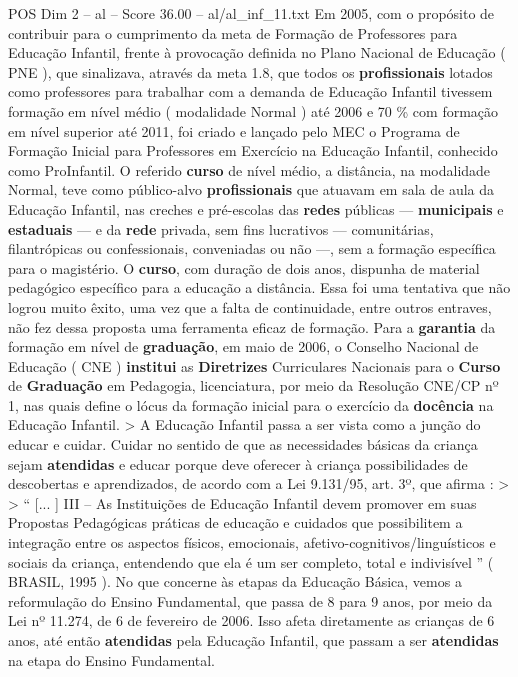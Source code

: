 \begin{textsample}{POS Dim 2 – al – Score 36.00 – al/al\_inf\_11.txt}
Em 2005, com o propósito de contribuir para o cumprimento da meta de Formação de Professores para Educação Infantil, frente à provocação definida no Plano Nacional de Educação ( PNE ), que sinalizava, através da meta 1.8, que todos os \textbf{profissionais} lotados como professores para trabalhar com a demanda de Educação Infantil tivessem formação em nível médio ( modalidade Normal ) até 2006 e 70 \% com formação em nível superior até 2011, foi criado e lançado pelo MEC o Programa de Formação Inicial para Professores em Exercício na Educação Infantil, conhecido como ProInfantil.
O referido \textbf{curso} de nível médio, a distância, na modalidade Normal, teve como público-alvo \textbf{profissionais} que atuavam em sala de aula da Educação Infantil, nas creches e pré-escolas das \textbf{redes} públicas — \textbf{municipais} e \textbf{estaduais} — e da \textbf{rede} privada, sem fins lucrativos — comunitárias, filantrópicas ou confessionais, conveniadas ou não —, sem a formação específica para o magistério.
O \textbf{curso}, com duração de dois anos, dispunha de material pedagógico específico para a educação a distância.
Essa foi uma tentativa que não logrou muito êxito, uma vez que a falta de continuidade, entre outros entraves, não fez dessa proposta uma ferramenta eficaz de formação.
Para a \textbf{garantia} da formação em nível de \textbf{graduação}, em maio de 2006, o Conselho Nacional de Educação ( CNE ) \textbf{institui} as \textbf{Diretrizes} Curriculares Nacionais para o \textbf{Curso} de \textbf{Graduação} em Pedagogia, licenciatura, por meio da Resolução CNE/CP nº 1, nas quais define o lócus da formação inicial para o exercício da \textbf{docência} na Educação Infantil. > A Educação Infantil passa a ser vista como a junção do educar e cuidar.
Cuidar no sentido de que as necessidades básicas da criança sejam \textbf{atendidas} e educar porque deve oferecer à criança possibilidades de descobertas e aprendizados, de acordo com a Lei 9.131/95, art. 3º, que afirma : > > “ [... ] III – As Instituições de Educação Infantil devem promover em suas Propostas Pedagógicas práticas de educação e cuidados que possibilitem a integração entre os aspectos físicos, emocionais, afetivo-cognitivos/linguísticos e sociais da criança, entendendo que ela é um ser completo, total e indivisível ” ( BRASIL, 1995 ).
No que concerne às etapas da Educação Básica, vemos a reformulação do Ensino Fundamental, que passa de 8 para 9 anos, por meio da Lei nº 11.274, de 6 de fevereiro de 2006.
Isso afeta diretamente as crianças de 6 anos, até então \textbf{atendidas} pela Educação Infantil, que passam a ser \textbf{atendidas} na etapa do Ensino Fundamental.

\end{textsample}
